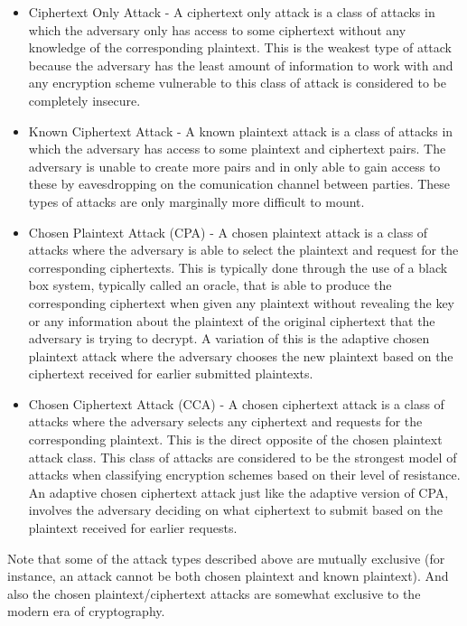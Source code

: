 \begin{itemize}
	\item Ciphertext Only Attack \cite{Menezes1996} - A ciphertext only attack is a class of attacks in which the adversary only has access to some ciphertext without any knowledge of the corresponding plaintext. This is the weakest type of attack because the adversary has the least amount of information to work with and any encryption scheme vulnerable to this class of attack is considered to be completely insecure.
	
	\item Known Ciphertext Attack \cite{Menezes1996} - A known plaintext attack is a class of attacks in which the adversary has access to some plaintext and ciphertext pairs. The  adversary is unable to create more pairs and in only able to gain access to these by eavesdropping on the comunication channel between parties. These types of attacks are only marginally more difficult to mount. 
	
	\item Chosen Plaintext Attack (CPA) \cite{Menezes1996} - A chosen plaintext attack is a class of attacks where the adversary is able to select the plaintext and request for the corresponding ciphertexts. This is typically done through the use of a black box system, typically called an oracle, that is able to produce the corresponding ciphertext when given any plaintext without revealing the key or any information about the plaintext of the original ciphertext that the adversary is trying to decrypt. A variation of this is the adaptive chosen plaintext attack where the adversary chooses the new plaintext based on the ciphertext received for earlier submitted plaintexts.
	
	\item Chosen Ciphertext Attack (CCA) \cite{Menezes1996} - A chosen ciphertext attack is a class of attacks where the adversary selects any ciphertext and requests for the corresponding plaintext. This is the direct opposite of the chosen plaintext attack class. This class of attacks are considered to be the strongest model of attacks when classifying encryption schemes based on their level of resistance. An adaptive chosen ciphertext attack just like the adaptive version of CPA, involves the adversary deciding on what ciphertext to submit based on the plaintext received for earlier requests.
	
\end{itemize}

Note that some of the attack types described above are mutually exclusive (for instance, an attack cannot be both chosen plaintext and known plaintext). And also the chosen plaintext/ciphertext attacks are somewhat exclusive to the modern era of cryptography.

